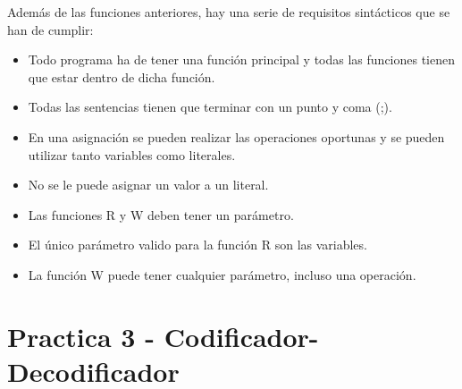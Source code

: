 Además de las funciones anteriores, hay una serie de requisitos sintácticos que se han de cumplir:

\begin{itemize}
	\item Todo programa ha de tener una función principal y todas las funciones tienen que estar dentro de dicha función.
	\item Todas las sentencias tienen que terminar con un punto y coma (;).
	\item En una asignación se pueden realizar las operaciones oportunas y se pueden utilizar tanto variables como literales.
	\item No se le puede asignar un valor a un literal.
	\item Las funciones R y W deben tener un parámetro.
	\item El único parámetro valido para la función R son las variables.
	\item La función W puede tener cualquier parámetro, incluso una operación.
\end{itemize}

\newpage
\section{Practica 3 - Codificador-Decodificador}



